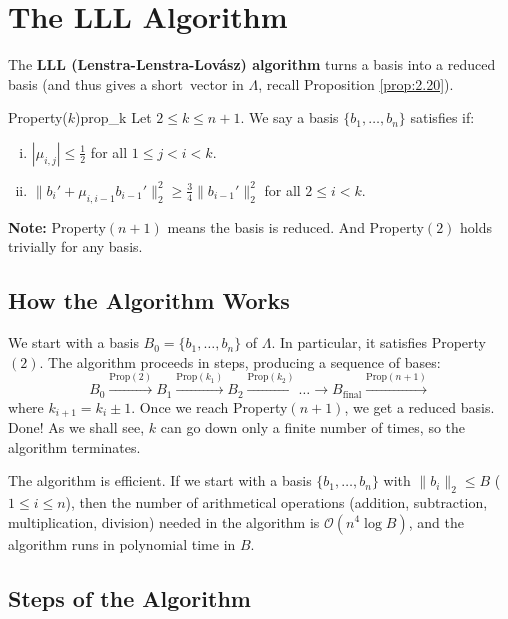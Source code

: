 \documentclass{Vorlesungstemplate_English} %
\begin{document}
\section{The LLL Algorithm}

The \textbf{LLL (Lenstra-Lenstra-Lovász) algorithm} turns a basis into a reduced basis (and thus gives a \glqq short\grqq \ vector in $\Lambda$, recall Proposition \ref{prop:2.20}).

\begin{definition}{Property($k$)}{prop_k}
    Let $2 \le k \le n+1$. We say a basis $\{ b_1, \dots, b_n \}$ satisfies  if:
    \begin{enumerate}[(i)]
        \item $|\mu_{i,j}| \le \frac{1}{2}$ for all $1 \le j < i < k$.
        \item $\|b_i' + \mu_{i,i-1}b_{i-1}'\|_2^2 \ge \frac{3}{4} \|b_{i-1}'\|_2^2$ for all $2 \le i < k$.
    \end{enumerate}
\end{definition}

\noindent \textbf{Note:} Property$(n+1)$ means the basis is reduced. And Property$(2)$ holds trivially for any basis.

\subsection{How the Algorithm Works}

We start with a basis $B_0 = \{ b_1, \dots, b_n \}$ of $\Lambda$. In particular, it satisfies Property$(2)$.
The algorithm proceeds in steps, producing a sequence of bases:
$$ B_0 \xrightarrow{\text{Prop}(2)} B_1 \xrightarrow{\text{Prop}(k_1)} B_2 \xrightarrow{\text{Prop}(k_2)} \dots \to B_{\text{final}} \xrightarrow{\text{Prop}(n+1)} $$
where $k_{i+1} = k_i \pm 1$. Once we reach Property$(n+1)$, we get a reduced basis. Done! As we shall see, $k$ can go down only a finite number of times, so the algorithm terminates.

 The algorithm is efficient. If we start with a basis $\{ b_1, \dots, b_n \}$ with $\|b_i\|_2 \le B$ ($1 \le i \le n$), then the number of arithmetical operations (addition, subtraction, multiplication, division) needed in the algorithm is $\mathcal{O}(n^4 \log B)$, and the algorithm runs in polynomial time in $B$.

\subsection{Steps of the Algorithm}
\end{document}
